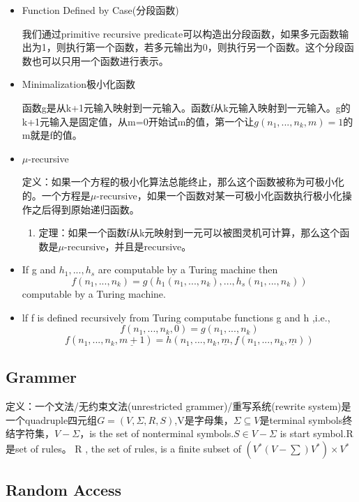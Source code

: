 \documentclass[UTF8]{ctexart}
\begin{document}
\begin{itemize}
    任何方程f从N元输入，输出0或者1，我们称这个方程为原始递归谓词

    \item Function Defined by Case(分段函数)
    
    我们通过primitive recursive predicate可以构造出分段函数，如果多元函数输出为1，则执行第一个函数，若多元输出为0，则执行另一个函数。这个分段函数也可以只用一个函数进行表示。

    \item Minimalization极小化函数
    
    函数g是从k+1元输入映射到一元输入。函数f从k元输入映射到一元输入。g的k+1元输入是固定值，从m=0开始试m的值，第一个让\(g(n_1,...,n_k,m)=1\)的m就是f的值。
    
    \item $\mu$-recursive
    
    定义：如果一个方程的极小化算法总能终止，那么这个函数被称为可极小化的。一个方程是$\mu$-recursive，如果一个函数对某一可极小化函数执行极小化操作之后得到原始递归函数。

    \begin{enumerate}
        \item 定理：如果一个函数f从k元映射到一元可以被图灵机可计算，那么这个函数是$\mu$-recursive，并且是recursive。
    \end{enumerate}

    \item If g and \(h_{1}, ..., h_{s}\) are computable by a Turing machine then \[f\left(n_{1}, ..., n_{k}\right)=g\left(h_{1}\left(n_{1}, ..., n_{k}\right), ..., h_{s}\left(n_{1}, ..., n_{k}\right)\right)\] computable by a Turing machine.
    \item lf f is defined recursively from Turing computabe functions g and h ,i.e., \[f\left(n_{1}, ..., n_{k}, 0\right)=g\left(n_{1}, ..., n_{k}\right)\] \[f\left(n_{1}, ..., n_{k}, \underline{m+1}\right)=h\left(n_{1}, ..., n_{k}, \underline{m}, f\left(n_{1}, ..., n_{k}, \underline{m}\right)\right)\]

\end{itemize}

\subsection{Grammer}

定义：一个文法/无约束文法(unrestricted grammer)/重写系统(rewrite system)是一个quadruple四元组$G=(V, \Sigma ,R, S)$,V是字母集，$\Sigma \subseteq V$是terminal symbols终结字符集，$V-\Sigma$，is the set of nonterminal symbols.$S \in V-\Sigma$ is start symbol.R是set of rules。
R , the set of rules, is a finite subset of \((V^{*}(V-\sum ) V^{*}) ×V^{*}\)
\subsection{Random Access}
\end{document}
